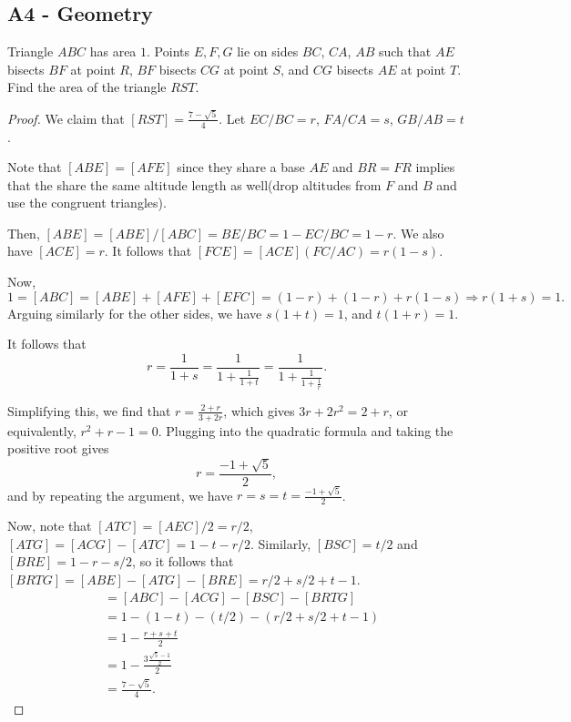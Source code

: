 \documentclass[11pt]{scrartcl}
\newcommand{\<}{\langle}
\renewcommand{\>}{\rangle}
\begin{document}
\subsection{A4 - Geometry}
Triangle $ABC$ has area $1$.  Points $E, F, G$ lie on sides $BC$, $CA$, $AB$ such that $AE$ bisects $BF$ at point $R$, $BF$ bisects $CG$ at point $S$, and $CG$ bisects $AE$ at point $T$.  Find the area of the triangle $RST$.

\begin{proof}
We claim that $[RST] = \frac{7- \sqrt{5}}{4}.$
Let $EC/BC = r$, $FA/CA = s$, $GB/AB = t$.

Note that $[ABE] = [AFE]$ since they share a base $AE$ and $BR = FR$ implies that the share the same altitude length as well(drop altitudes from $F$ and $B$ and use the congruent triangles).  

Then, $[ABE] = [ABE]/[ABC]= BE/BC = 1 - EC/BC = 1-r$.  We also have $[ACE] = r$.  It follows that $[FCE] = [ACE] (FC/AC) = r(1-s)$.

Now,
$$1 = [ABC] = [ABE] + [AFE] + [EFC] = (1-r) + (1-r) + r(1-s) \Longrightarrow r(1+s) = 1.$$
Arguing similarly for the other sides, we have $s(1+t) = 1$, and $t(1+r) = 1$.  

It follows that 
$$r = \frac{1}{1+s} = \frac{1}{1 + \frac{1}{1+t}} = \frac{1}{1 + \frac{1}{1 + \frac{1}{r}}}.$$

Simplifying this, we find that $r = \frac{2+r}{3 + 2r}$, which gives $3r + 2r^2 = 2+ r$, or equivalently, $r^2 + r - 1 = 0$.  Plugging into the quadratic formula and taking the positive root gives
$$r =\frac{-1 + \sqrt{5}}{2},$$
and by repeating the argument, we have $r = s = t = \frac{-1 + \sqrt{5}}{2}$.  

Now, note that $[ATC] = [AEC] / 2 = r/2$, $[ATG] = [ACG] - [ATC] = 1 - t - r/2$.  Similarly, $[BSC] = t/2$ and $[BRE] = 1 - r - s/2$, so it follows that $[BRTG] = [ABE] - [ATG] - [BRE] = r/2 + s/2 + t - 1$.
\begin{align*}
[RST] &= [ABC] - [ACG] - [BSC] - [BRTG] \\
&= 1 - (1 - t) - (t/2) - (r/2 + s/2 + t - 1)\\
&= 1 - \frac{r + s + t}{2} \\
&= 1 - \frac{3\frac{\sqrt{5} - 1}{2}}{2} \\
&= \frac{7 - \sqrt{5}}{4}.
\end{align*}
\end{proof}
\end{document}

